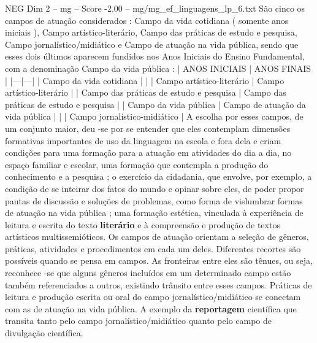 \begin{textsample}{NEG Dim 2 – mg – Score -2.00 – mg/mg\_ef\_linguagens\_lp\_6.txt}
São cinco os campos de atuação considerados : Campo da vida cotidiana ( somente anos iniciais ), Campo artístico-literário, Campo das práticas de estudo e pesquisa, Campo jornalístico/midiático e Campo de atuação na vida pública, sendo que esses dois últimos aparecem fundidos nos Anos Iniciais do Ensino Fundamental, com a denominação Campo da vida pública : | ANOS INICIAIS | ANOS FINAIS | |---|---| | Campo da vida cotidiana | | | Campo artístico-literário | Campo artístico-literário | | Campo das práticas de estudo e pesquisa | Campo das práticas de estudo e pesquisa | | Campo da vida pública | Campo de atuação da vida pública | | | Campo jornalístico-midiático | A escolha por esses campos, de um conjunto maior, deu -se por se entender que eles contemplam dimensões formativas importantes de uso da linguagem na escola e fora dela e criam condições para uma formação para a atuação em atividades do dia a dia, no espaço familiar e escolar, uma formação que contempla a produção do conhecimento e a pesquisa ; o exercício da cidadania, que envolve, por exemplo, a condição de se inteirar dos fatos do mundo e opinar sobre eles, de poder propor pautas de discussão e soluções de problemas, como forma de vislumbrar formas de atuação na vida pública ; uma formação estética, vinculada à experiência de leitura e escrita do texto \textbf{literário} e à compreensão e produção de textos artísticos multissemióticos.
Os campos de atuação orientam a seleção de gêneros, práticas, atividades e procedimentos em cada um deles.
Diferentes recortes são possíveis quando se pensa em campos.
As fronteiras entre eles são tênues, ou seja, reconhece -se que alguns gêneros incluídos em um determinado campo estão também referenciados a outros, existindo trânsito entre esses campos.
Práticas de leitura e produção escrita ou oral do campo jornalístico/midiático se conectam com as de atuação na vida pública.
A exemplo da \textbf{reportagem} científica que transita tanto pelo campo jornalístico/midiático quanto pelo campo de divulgação científica.

\end{textsample}
